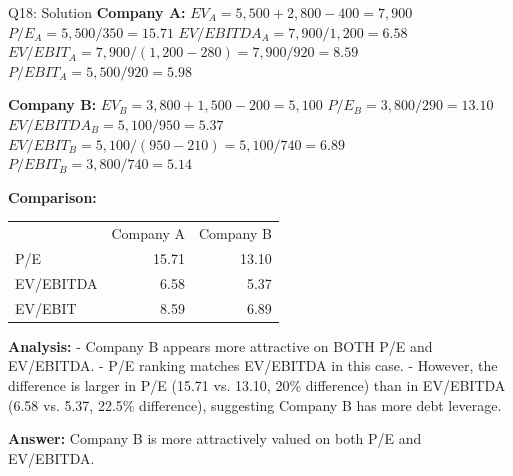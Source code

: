\documentclass{beamer}
\renewcommand{\scriptsize}{\fontsize{6pt}{7pt}\selectfont}
\begin{document}
	\begin{frame}{Q18: Solution}
		\scriptsize
		\textbf{Company A:}
		$EV_A = 5,500 + 2,800 - 400 = 7,900$
		$P/E_A = 5,500/350 = 15.71$
		$EV/EBITDA_A = 7,900/1,200 = 6.58$
		$EV/EBIT_A = 7,900/(1,200 - 280) = 7,900/920 = 8.59$
		$P/EBIT_A = 5,500/920 = 5.98$
		
		\vspace{2pt}
		\textbf{Company B:}
		$EV_B = 3,800 + 1,500 - 200 = 5,100$
		$P/E_B = 3,800/290 = 13.10$
		$EV/EBITDA_B = 5,100/950 = 5.37$
		$EV/EBIT_B = 5,100/(950 - 210) = 5,100/740 = 6.89$
		$P/EBIT_B = 3,800/740 = 5.14$
		
		\vspace{2pt}
		\textbf{Comparison:}
		\begin{tabular}{lrr}
			& Company A & Company B \\
			P/E & 15.71 & 13.10 \\
			EV/EBITDA & 6.58 & 5.37 \\
			EV/EBIT & 8.59 & 6.89 \\
		\end{tabular}
		
		\vspace{2pt}
		\textbf{Analysis:}
		- Company B appears more attractive on BOTH P/E and EV/EBITDA.
		- P/E ranking matches EV/EBITDA in this case.
		- However, the difference is larger in P/E (15.71 vs. 13.10, 20\% difference) than in EV/EBITDA (6.58 vs. 5.37, 22.5\% difference), suggesting Company B has more debt leverage.
		
		\textbf{Answer:} Company B is more attractively valued on both P/E and EV/EBITDA.
	\end{frame}
	
\end{document}
